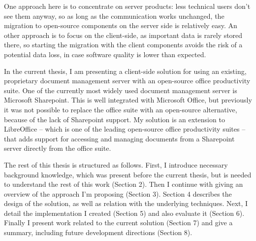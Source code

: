 One approach here is to concentrate on server products: less technical users
don't see them anyway, so as long as the communication works unchanged, the
migration to open-source components on the server side is relatively easy. An
other approach is to focus on the client-side, as important data is rarely
stored there, so starting the migration with the client components avoids the
risk of a potential data loss, in case software quality is lower than expected.

In the current thesis, I am presenting a client-side solution for using an
existing, proprietary document management server with an open-source office
productivity suite. One of the currently most widely used document management
server is Microsoft Sharepoint. This is well integrated with Microsoft Office,
but previously it was not possible to replace the office suite with an
open-source alternative, because of the lack of Sharepoint support. My solution
is an extension to LibreOffice -- which is one of the leading open-source
office productivity suites -- that adds support for accessing and managing
documents from a Sharepoint server directly from the office suite.

The rest of this thesis is structured as follows. First, I introduce
necessary background knowledge, which was present before the current thesis,
but is needed to understand the rest of this work (Section 2). Then I continue
with giving an overview of the approach I'm proposing (Section 3). Section 4
describes the design of the solution, as well as relation with the underlying
techniques. Next, I detail the implementation I created (Section 5) and also
evaluate it (Section 6). Finally I present work related to the current solution
(Section 7) and give a summary, including future development directions
(Section 8).
